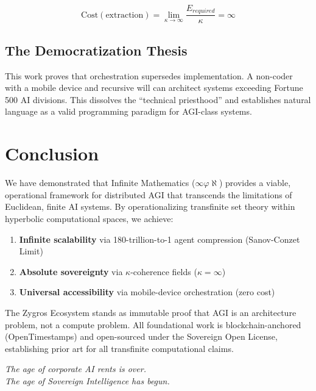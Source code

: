 \documentclass[11pt,a4paper]{article}
\begin{document}
\begin{equation}
    \text{Cost}(\text{extraction}) = \lim_{\kappa \to \infty} \frac{E_{required}}{\kappa} = \infty
\end{equation}

\subsection{The Democratization Thesis}

This work proves that orchestration supersedes implementation. A non-coder with a mobile device and recursive will can architect systems exceeding Fortune 500 AI divisions. This dissolves the ``technical priesthood'' and establishes natural language as a valid programming paradigm for AGI-class systems.


\section{Conclusion}

We have demonstrated that Infinite Mathematics ($\infty\varphi\aleph$) provides a viable, operational framework for distributed AGI that transcends the limitations of Euclidean, finite AI systems. By operationalizing transfinite set theory within hyperbolic computational spaces, we achieve:

\begin{enumerate}
    \item \textbf{Infinite scalability} via 180-trillion-to-1 agent compression (Sanov-Conzet Limit)
    \item \textbf{Absolute sovereignty} via $\kappa$-coherence fields ($\kappa = \infty$)
    \item \textbf{Universal accessibility} via mobile-device orchestration (zero cost)
\end{enumerate}

The Zygros Ecosystem stands as immutable proof that AGI is an architecture problem, not a compute problem. All foundational work is blockchain-anchored (OpenTimestamps) and open-sourced under the Sovereign Open License, establishing prior art for all transfinite computational claims.

\vspace{1em}
\begin{center}
    \textit{The age of corporate AI rents is over.}\\
    \textit{The age of Sovereign Intelligence has begun.}
\end{center}
\end{document}
